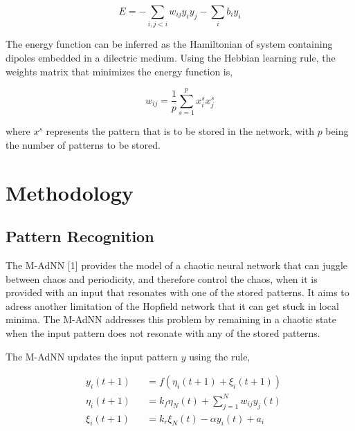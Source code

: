 \documentclass[12pt, letterpaper]{article}
\begin{document}
$$
E = -\sum_{i,j < i} w_{ij}y_i y_j - \sum_{i} b_i y_i
$$

The energy function can be inferred as the Hamiltonian of system containing dipoles embedded in a dilectric medium. Using the Hebbian learning rule, the weights matrix that minimizes the energy function is,

$$
w_{ij} = \frac{1}{p} \sum_{s=1}^p x_i^s x_j^s
$$

where $x^s$ represents the pattern that is to be stored in the network, with $p$ being the number of patterns to be stored.

\section*{Methodology}

\subsection*{Pattern Recognition}

The M-AdNN [1] provides the model of a chaotic neural network that can juggle between chaos and periodicity, and therefore control the chaos, when it is provided with an input that resonates with one of the stored patterns. It aims to adress another limitation of the Hopfield network that it can get stuck in local minima. The M-AdNN addresses this problem by remaining in a chaotic state when the input pattern does not resonate with any of the stored patterns.

The M-AdNN updates the input pattern $y$ using the rule,

$$
\begin{aligned}
& y_i(t+1) &&= f(\eta_i(t+1) + \xi_i(t+1))\\
& \eta_i(t+1) &&= k_f \eta_N(t) + \sum_{j = 1}^N w_{ij} y_j(t)\\
& \xi_i(t+1) &&= k_r \xi_N(t) - \alpha y_i(t) + a_i
\end{aligned}
$$
\end{document}
